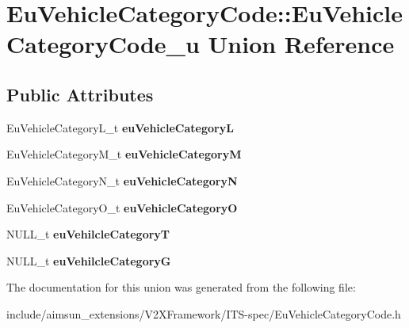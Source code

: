 \hypertarget{unionEuVehicleCategoryCode_1_1EuVehicleCategoryCode__u}{}\section{Eu\+Vehicle\+Category\+Code\+:\+:Eu\+Vehicle\+Category\+Code\+\_\+u Union Reference}
\label{unionEuVehicleCategoryCode_1_1EuVehicleCategoryCode__u}
\subsection*{Public Attributes}
\begin{DoxyCompactItemize}
\item 
Eu\+Vehicle\+Category\+L\+\_\+t {\bfseries eu\+Vehicle\+CategoryL}\hypertarget{unionEuVehicleCategoryCode_1_1EuVehicleCategoryCode__u_a531a6580043693921d9443b2a8f611b8}{}\label{unionEuVehicleCategoryCode_1_1EuVehicleCategoryCode__u_a531a6580043693921d9443b2a8f611b8}

\item 
Eu\+Vehicle\+Category\+M\+\_\+t {\bfseries eu\+Vehicle\+CategoryM}\hypertarget{unionEuVehicleCategoryCode_1_1EuVehicleCategoryCode__u_a1369213fa06ec032c07e84ac8998be6a}{}\label{unionEuVehicleCategoryCode_1_1EuVehicleCategoryCode__u_a1369213fa06ec032c07e84ac8998be6a}

\item 
Eu\+Vehicle\+Category\+N\+\_\+t {\bfseries eu\+Vehicle\+CategoryN}\hypertarget{unionEuVehicleCategoryCode_1_1EuVehicleCategoryCode__u_a779d3a50abb03ef6163292269df15046}{}\label{unionEuVehicleCategoryCode_1_1EuVehicleCategoryCode__u_a779d3a50abb03ef6163292269df15046}

\item 
Eu\+Vehicle\+Category\+O\+\_\+t {\bfseries eu\+Vehicle\+CategoryO}\hypertarget{unionEuVehicleCategoryCode_1_1EuVehicleCategoryCode__u_a8b439fbea8a293efd0b266b19acc5f9a}{}\label{unionEuVehicleCategoryCode_1_1EuVehicleCategoryCode__u_a8b439fbea8a293efd0b266b19acc5f9a}

\item 
N\+U\+L\+L\+\_\+t {\bfseries eu\+Vehilcle\+CategoryT}\hypertarget{unionEuVehicleCategoryCode_1_1EuVehicleCategoryCode__u_a5063834f8710bb24d8ba49c70bc76df9}{}\label{unionEuVehicleCategoryCode_1_1EuVehicleCategoryCode__u_a5063834f8710bb24d8ba49c70bc76df9}

\item 
N\+U\+L\+L\+\_\+t {\bfseries eu\+Vehilcle\+CategoryG}\hypertarget{unionEuVehicleCategoryCode_1_1EuVehicleCategoryCode__u_acf74a70d95d7f8976a855ecedd56b9ac}{}\label{unionEuVehicleCategoryCode_1_1EuVehicleCategoryCode__u_acf74a70d95d7f8976a855ecedd56b9ac}

\end{DoxyCompactItemize}


The documentation for this union was generated from the following file\+:\begin{DoxyCompactItemize}
\item 
include/aimsun\+\_\+extensions/\+V2\+X\+Framework/\+I\+T\+S-\/spec/Eu\+Vehicle\+Category\+Code.\+h\end{DoxyCompactItemize}
